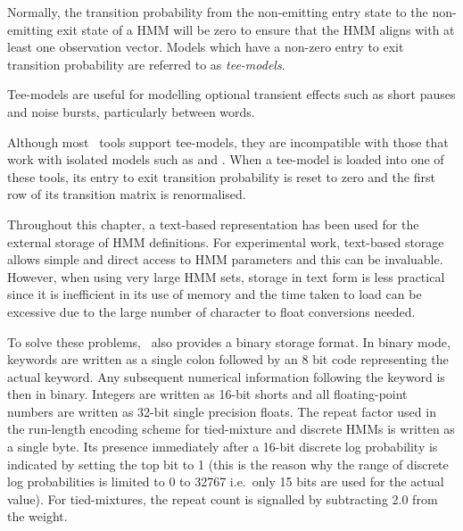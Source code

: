 Normally, the transition probability from the non-emitting entry
state to the non-emitting exit state of a HMM will be zero to ensure
that the HMM aligns with at least one observation vector.  
Models which have a non-zero entry to exit transition probability 
are referred to as {\it tee-models}.

Tee-models are useful for modelling optional transient effects
such as short pauses and noise bursts, particularly between words.

Although most \HTK\ tools support tee-models, they are incompatible with
those that work with isolated models such as  and
. When a tee-model is loaded into one of these tools, its
entry to exit transition probability is reset to zero and the first row of
its transition matrix is renormalised.



Throughout this chapter, a text-based representation
has been used for the external storage of HMM
definitions.  For experimental work, text-based storage allows
simple and direct 
access to HMM parameters and this can be invaluable.
However, when using very large HMM sets, storage in text form
is less practical since it is inefficient in its use of
memory and the time taken to load can be excessive due to
the large number of character to float conversions needed.

To solve these problems, \HTK\ also provides a 
binary storage
format.  In binary mode, keywords are written as a single
colon followed by an 8 bit code representing the actual
keyword.  Any subsequent numerical information following
the keyword is then in binary.  Integers are written as
16-bit shorts and all floating-point numbers are written
as 32-bit single precision floats.  The repeat
factor used in the run-length encoding
scheme for tied-mixture and discrete HMMs is written as
a single byte.  Its presence immediately after a 16-bit
discrete log probability is indicated by setting the top
bit to 1 (this is the reason why the range of discrete 
log probabilities is limited to
0 to 32767 i.e.\ only 15 bits are used for the actual
value).  For tied-mixtures, the repeat count is signalled
by subtracting 2.0 from the weight.

